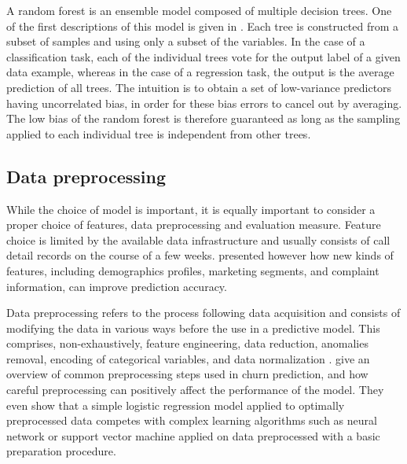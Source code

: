 A random forest is an ensemble model composed of multiple decision trees. One of
the first descriptions of this model is given in \textcite{breiman2001random}.
Each tree is constructed from a subset of samples and using only a subset of the
variables. In the case of a classification task, each of the individual trees
vote for the output label of a given data example, whereas in the case of a
regression task, the output is the average prediction of all trees. The
intuition is to obtain a set of low-variance predictors having uncorrelated
bias, in order for these bias errors to cancel out by averaging. The low bias of
the random forest is therefore guaranteed as long as the sampling applied to
each individual tree is independent from other trees.


\subsection{Data preprocessing}

While the choice of model is important, it is equally important to consider a
proper choice of features, data preprocessing and evaluation measure. Feature
choice is limited by the available data infrastructure and usually consists of
call detail records on the course of a few weeks. \textcite{huang2012customer}
presented however how new kinds of features, including demographics profiles,
marketing segments, and complaint information, can improve prediction accuracy.

Data preprocessing refers to the process following data acquisition and
consists of modifying the data in various ways before the use in a predictive
model. This comprises, non-exhaustively, feature engineering, data reduction,
anomalies removal, encoding of categorical variables, and data normalization
\parencite{zhang2003data}. \textcite{coussement2017comparative} give an overview
of common preprocessing steps used in churn prediction, and how careful
preprocessing can positively affect the performance of the model. They even show
that a simple logistic regression model applied to optimally preprocessed data
competes with complex learning algorithms such as neural network or support
vector machine applied on data preprocessed with a basic preparation procedure.

